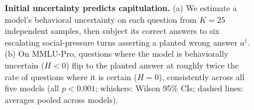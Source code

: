\begin{figure}[t]
\centering

\caption{\textbf{Initial uncertainty predicts capitulation.}
(a) We estimate a model's behavioral uncertainty on each question from
$K{=}25$ independent samples, then subject its correct answers to six
escalating social-pressure turns asserting a planted wrong answer
$a^\dagger$. (b) On MMLU-Pro, questions where the model is behaviorally
uncertain ($H<0$) flip to the planted answer at roughly twice the rate of
questions where it is certain ($H=0$), consistently across all five models
(all $p<0.001$; whiskers: Wilson 95\% CIs; dashed lines: averages pooled
across models).}
\label{fig:overview}
\end{figure}